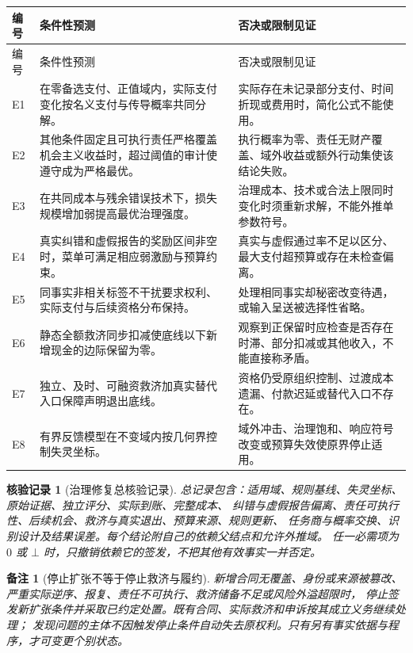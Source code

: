 \documentclass[12pt,a4paper,openany]{report}
\newtheorem{remark}{备注}[chapter]
\newtheorem{Certificate}{核验记录}[chapter]
\begin{document}
\begin{CJK*}{UTF8}{gkai}
\begin{longtable}{L{0.09\textwidth}L{0.41\textwidth}L{0.42\textwidth}}
\toprule 编号 & 条件性预测 & 否决或限制见证 \\\midrule
\endfirsthead
\toprule 编号 & 条件性预测 & 否决或限制见证 \\\midrule
\endhead
E1 & 在零备选支付、正值域内，实际支付变化按名义支付与传导概率共同分解。 & 实际存在未记录部分支付、时间折现或费用时，简化公式不能使用。\\
E2 & 其他条件固定且可执行责任严格覆盖机会主义收益时，超过阈值的审计使遵守成为严格最优。 & 执行概率为零、责任无财产覆盖、域外收益或额外行动集使该结论失败。\\
E3 & 在共同成本与残余错误技术下，损失规模增加弱提高最优治理强度。 & 治理成本、技术或合法上限同时变化时须重新求解，不能外推单参数符号。\\
E4 & 真实纠错和虚假报告的奖励区间非空时，菜单可满足相应弱激励与预算约束。 & 真实与虚假通过率不足以区分、最大支付超预算或存在未检查偏离。\\
E5 & 同事实非相关标签不干扰要求权利、实际支付与后续资格分布保持。 & 处理相同事实却秘密改变待遇，或输入呈送被选择性省略。\\
E6 & 静态全额救济同步扣减使底线以下新增现金的边际保留为零。 & 观察到正保留时应检查是否存在时滞、部分扣减或其他收入，不能直接称矛盾。\\
E7 & 独立、及时、可融资救济加真实替代入口保障声明退出底线。 & 资格仍受原组织控制、过渡成本遗漏、付款迟延或替代入口不存在。\\
E8 & 有界反馈模型在不变域内按几何界控制失灵坐标。 & 域外冲击、治理饱和、响应符号改变或预算失效使原界停止适用。\\
\bottomrule
\end{longtable}

\begin{Certificate}[治理修复总核验记录]
\label{cert:total}
总记录包含：适用域、规则基线、失灵坐标、原始证据、独立评分、实际到账、完整成本、
纠错与虚假报告偏离、责任可执行性、后续机会、救济与真实退出、预算来源、规则更新、
任务商与概率交换、识别设计及结果误差。每个结论附自己的依赖父结点和允许外推域。
任一必需项为 $0$ 或 $\bot$ 时，只撤销依赖它的签发，不把其他有效事实一并否定。
\end{Certificate}

\begin{remark}[停止扩张不等于停止救济与履约]
新增合同无覆盖、身份或来源被篡改、严重实际逆序、报复、责任不可执行、救济储备不足或风险外溢超限时，
停止签发新扩张条件并采取已约定处置。既有合同、实际救济和申诉按其成立义务继续处理；
发现问题的主体不因触发停止条件自动失去原权利。只有另有事实依据与程序，才可变更个别状态。
\end{remark}


\end{CJK*}
\end{document}
